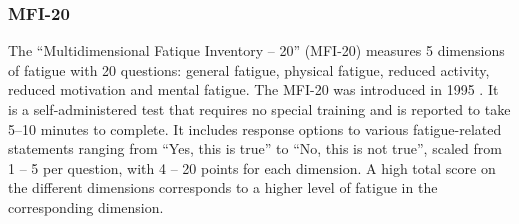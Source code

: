 \subsubsection{\acl{MFI-20}}
\label{questionnaires:MFI20}
The ``Multidimensional Fatique Inventory – 20'' (\acs{MFI-20}) measures 5 dimensions of fatigue with 20 questions: general fatigue, physical fatigue, reduced activity, reduced motivation and mental fatigue. The \acs{MFI-20} was introduced in 1995 \cite{smets1995mfi20}. It is a self-administered test that requires no special training and is reported to take 5--10 minutes to complete. It includes response options to various fatigue-related statements ranging from ``Yes, this is true'' to ``No, this is not true'', scaled from 1 -- 5 per question, with 4 -- 20 points for each dimension. A high total score on the different dimensions corresponds to a higher level of fatigue in the corresponding dimension.

